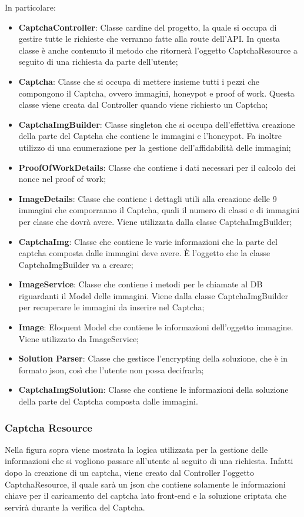 In particolare:
\begin{itemize}
    \item \textbf{CaptchaController}: Classe cardine del progetto, la quale si occupa di gestire tutte le richieste che verranno fatte alla route dell'API. In questa classe è anche contenuto il metodo che ritornerà l'oggetto CaptchaResource a seguito di una richiesta da parte dell'utente;
    \item \textbf{Captcha}: Classe che si occupa di mettere insieme tutti i pezzi che compongono il Captcha, ovvero immagini, honeypot e proof of work. Questa classe viene creata dal Controller quando viene richiesto un Captcha;
    \item \textbf{CaptchaImgBuilder}: Classe singleton che si occupa dell'effettiva creazione della parte del Captcha che contiene le immagini e l'honeypot. Fa inoltre utilizzo di una enumerazione per la gestione dell'affidabilità delle immagini;
    \item \textbf{ProofOfWorkDetails}: Classe che contiene i dati necessari per il calcolo dei nonce nel proof of work;
    \item \textbf{ImageDetails}: Classe che contiene i dettagli utili alla creazione delle 9 immagini che comporranno il Captcha, quali il numero di classi e di immagini per classe che dovrà avere. Viene utilizzata dalla classe CaptchaImgBuilder;
    \item \textbf{CaptchaImg}: Classe che contiene le varie informazioni che la parte del captcha composta dalle immagini deve avere. È l'oggetto che la classe CaptchaImgBuilder va a creare;
    \item \textbf{ImageService}: Classe che contiene i metodi per le chiamate al DB riguardanti il Model delle immagini. Viene dalla classe CaptchaImgBuilder per recuperare le immagini da inserire nel Captcha;
    \item \textbf{Image}: Eloquent Model che contiene le informazioni dell'oggetto immagine. Viene utilizzato da ImageService;
    \item \textbf{Solution Parser}: Classe che gestisce l'encrypting della soluzione, che è in formato json, così che l'utente non possa decifrarla;
    \item \textbf{CaptchaImgSolution}: Classe che contiene le informazioni della soluzione della parte del Captcha composta dalle immagini.
\end{itemize}

\subsubsection{Captcha Resource}
Nella figura sopra viene mostrata la logica utilizzata per la gestione delle informazioni che si vogliono passare all'utente al seguito di una richiesta. Infatti dopo la creazione di un captcha, viene creato dal Controller l'oggetto CaptchaResource, il quale sarà un json che contiene solamente le informazioni chiave per il caricamento del captcha lato front-end e la soluzione criptata che servirà durante la verifica del Captcha.

